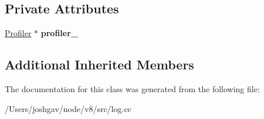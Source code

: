 \subsection*{Private Attributes}
\begin{DoxyCompactItemize}
\item 
\hyperlink{classv8_1_1internal_1_1_profiler}{Profiler} $\ast$ {\bfseries profiler\+\_\+}\hypertarget{classv8_1_1internal_1_1_ticker_a5c48513b9a0a300579240ce5ee6c4a6f}{}\label{classv8_1_1internal_1_1_ticker_a5c48513b9a0a300579240ce5ee6c4a6f}

\end{DoxyCompactItemize}
\subsection*{Additional Inherited Members}


The documentation for this class was generated from the following file\+:\begin{DoxyCompactItemize}
\item 
/\+Users/joshgav/node/v8/src/log.\+cc\end{DoxyCompactItemize}
